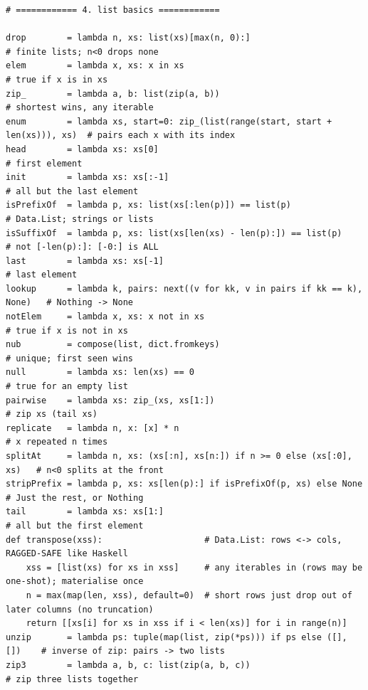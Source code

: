 \documentclass[11pt,letterpaper]{book}
\begin{document}
\begin{lstlisting}[style=code]
# ============ 4. list basics ============

drop        = lambda n, xs: list(xs)[max(n, 0):]                           # finite lists; n<0 drops none
elem        = lambda x, xs: x in xs                                        # true if x is in xs
zip_        = lambda a, b: list(zip(a, b))                                 # shortest wins, any iterable
enum        = lambda xs, start=0: zip_(list(range(start, start + len(xs))), xs)  # pairs each x with its index
head        = lambda xs: xs[0]                                             # first element
init        = lambda xs: xs[:-1]                                           # all but the last element
isPrefixOf  = lambda p, xs: list(xs[:len(p)]) == list(p)                   # Data.List; strings or lists
isSuffixOf  = lambda p, xs: list(xs[len(xs) - len(p):]) == list(p)         # not [-len(p):]: [-0:] is ALL
last        = lambda xs: xs[-1]                                            # last element
lookup      = lambda k, pairs: next((v for kk, v in pairs if kk == k), None)   # Nothing -> None
notElem     = lambda x, xs: x not in xs                                    # true if x is not in xs
nub         = compose(list, dict.fromkeys)                                 # unique; first seen wins
null        = lambda xs: len(xs) == 0                                      # true for an empty list
pairwise    = lambda xs: zip_(xs, xs[1:])                                  # zip xs (tail xs)
replicate   = lambda n, x: [x] * n                                         # x repeated n times
splitAt     = lambda n, xs: (xs[:n], xs[n:]) if n >= 0 else (xs[:0], xs)   # n<0 splits at the front
stripPrefix = lambda p, xs: xs[len(p):] if isPrefixOf(p, xs) else None     # Just the rest, or Nothing
tail        = lambda xs: xs[1:]                                            # all but the first element
def transpose(xss):                    # Data.List: rows <-> cols, RAGGED-SAFE like Haskell
    xss = [list(xs) for xs in xss]     # any iterables in (rows may be one-shot); materialise once
    n = max(map(len, xss), default=0)  # short rows just drop out of later columns (no truncation)
    return [[xs[i] for xs in xss if i < len(xs)] for i in range(n)]
unzip       = lambda ps: tuple(map(list, zip(*ps))) if ps else ([], [])    # inverse of zip: pairs -> two lists
zip3        = lambda a, b, c: list(zip(a, b, c))                           # zip three lists together
\end{lstlisting}
\end{document}
